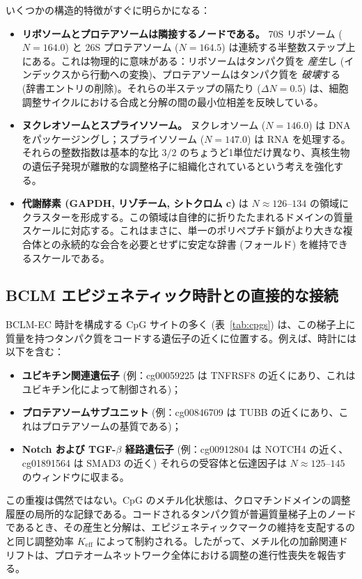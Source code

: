 \documentclass[12pt,a4paper]{ltjsarticle}
\begin{document}
	いくつかの構造的特徴がすぐに明らかになる：
	\begin{itemize}
		\item \textbf{リボソームとプロテアソームは隣接するノードである。} 70S リボソーム (\(N=164.0\)) と 26S プロテアソーム (\(N=164.5\)) は連続する半整数ステップ上にある。これは物理的に意味がある：リボソームはタンパク質を \emph{産生}し (インデックスから行動への変換)、プロテアソームはタンパク質を \emph{破壊}する (辞書エントリの削除)。それらの半ステップの隔たり (\(\Delta N = 0.5\)) は、細胞調整サイクルにおける合成と分解の間の最小位相差を反映している。
		\item \textbf{ヌクレオソームとスプライソソーム。} ヌクレオソーム (\(N=146.0\)) は DNA をパッケージングし；スプライソソーム (\(N=147.0\)) は RNA を処理する。それらの整数指数は基本的な比 \(3/2\) のちょうど1単位だけ異なり、真核生物の遺伝子発現が離散的な調整格子に組織化されているという考えを強化する。
		\item \textbf{代謝酵素 (GAPDH, リゾチーム, シトクロム c)} は \(N \approx 126\)--\(134\) の領域にクラスターを形成する。この領域は自律的に折りたたまれるドメインの質量スケールに対応する。これはまさに、単一のポリペプチド鎖がより大きな複合体との永続的な会合を必要とせずに安定な辞書 (フォールド) を維持できるスケールである。
	\end{itemize}
	
	\subsection{BCLM エピジェネティック時計との直接的な接続}
	
	BCLM-EC 時計を構成する CpG サイトの多く (表~\ref{tab:cpgs}) は、この梯子上に質量を持つタンパク質をコードする遺伝子の近くに位置する。例えば、時計には以下を含む：
	\begin{itemize}
		\item \textbf{ユビキチン関連遺伝子} (例：cg00059225 は TNFRSF8 の近くにあり、これはユビキチン化によって制御される)；
		\item \textbf{プロテアソームサブユニット} (例：cg00846709 は TUBB の近くにあり、これはプロテアソームの基質である)；
		\item \textbf{Notch および TGF-\(\beta\) 経路遺伝子} (例：cg00912804 は NOTCH4 の近く、cg01891564 は SMAD3 の近く) それらの受容体と伝達因子は \(N \approx 125\)--\(145\) のウィンドウに収まる。
	\end{itemize}
	
	この重複は偶然ではない。CpG のメチル化状態は、クロマチンドメインの調整履歴の局所的な記録である。コードされるタンパク質が普遍質量梯子上のノードであるとき、その産生と分解は、エピジェネティックマークの維持を支配するのと同じ調整効率 \(K_{\mathrm{eff}}\) によって制約される。したがって、メチル化の加齢関連ドリフトは、プロテオームネットワーク全体における調整の進行性喪失を報告する。
	
\end{document}

